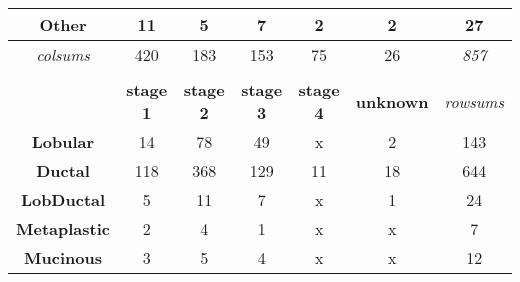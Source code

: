 \begin{table}[!h]
\begin{tabular}{ccccccc}
                \multicolumn{1}{c|}{\textbf{Other}} & \multicolumn{1}{c|}{11} & \multicolumn{1}{c|}{5} & \multicolumn{1}{c|}{7} & \multicolumn{1}{c|}{2} & \multicolumn{1}{c|}{2} & \multicolumn{1}{c|}{{\color[HTML]{656565} 27}} \\ \hline
                \multicolumn{1}{c|}{{\color[HTML]{9B9B9B} \textit{colsums}}} & \multicolumn{1}{c|}{{\color[HTML]{656565} 420}} & \multicolumn{1}{c|}{{\color[HTML]{656565} 183}} & \multicolumn{1}{c|}{{\color[HTML]{656565} 153}} & \multicolumn{1}{c|}{{\color[HTML]{656565} 75}} & \multicolumn{1}{c|}{{\color[HTML]{656565} 26}} & \multicolumn{1}{c|}{\textit{857}} \\ \cline{2-7} 
                \multicolumn{1}{l}{} & \multicolumn{1}{l}{} & \multicolumn{1}{l}{} & \multicolumn{1}{l}{} & \multicolumn{1}{l}{} & \multicolumn{1}{l}{} & \multicolumn{1}{l}{} \\
                \multicolumn{1}{c|}{} & \multicolumn{1}{c|}{\textbf{stage 1}} & \multicolumn{1}{c|}{\textbf{stage 2}} & \multicolumn{1}{c|}{\textbf{stage 3}} & \multicolumn{1}{c|}{\textbf{stage 4}} & \multicolumn{1}{c|}{\textbf{unknown}} & {\color[HTML]{9B9B9B} \textit{rowsums}} \\ \hline
                \multicolumn{1}{c|}{\textbf{Lobular}} & \multicolumn{1}{c|}{14} & \multicolumn{1}{c|}{78} & \multicolumn{1}{c|}{49} & \multicolumn{1}{c|}{{\color[HTML]{C0C0C0} x}} & \multicolumn{1}{c|}{2} & \multicolumn{1}{c|}{143} \\ \hline
                \multicolumn{1}{c|}{\textbf{Ductal}} & \multicolumn{1}{c|}{118} & \multicolumn{1}{c|}{368} & \multicolumn{1}{c|}{129} & \multicolumn{1}{c|}{11} & \multicolumn{1}{c|}{18} & \multicolumn{1}{c|}{644} \\ \hline
                \multicolumn{1}{c|}{\textbf{LobDuctal}} & \multicolumn{1}{c|}{5} & \multicolumn{1}{c|}{11} & \multicolumn{1}{c|}{7} & \multicolumn{1}{c|}{{\color[HTML]{C0C0C0} x}} & \multicolumn{1}{c|}{1} & \multicolumn{1}{c|}{24} \\ \hline
                \multicolumn{1}{c|}{\textbf{Metaplastic}} & \multicolumn{1}{c|}{2} & \multicolumn{1}{c|}{4} & \multicolumn{1}{c|}{1} & \multicolumn{1}{c|}{{\color[HTML]{C0C0C0} x}} & \multicolumn{1}{c|}{{\color[HTML]{C0C0C0} x}} & \multicolumn{1}{c|}{7} \\ \hline
                \multicolumn{1}{c|}{\textbf{Mucinous}} & \multicolumn{1}{c|}{3} & \multicolumn{1}{c|}{5} & \multicolumn{1}{c|}{4} & \multicolumn{1}{c|}{{\color[HTML]{C0C0C0} x}} & \multicolumn{1}{c|}{{\color[HTML]{C0C0C0} x}} & \multicolumn{1}{c|}{12} \\ \hline

\end{tabular}
\end{table}
